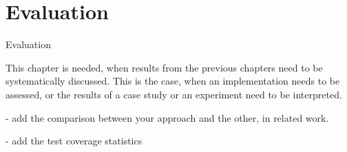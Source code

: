 \chapter{Evaluation}
\label{Evaluation}

Evaluation

This chapter is needed, when results from the previous chapters need to be systematically discussed. This is the case, when an implementation needs to be assessed, or the results of a case study or an experiment need to be interpreted.


- add the comparison between your approach and the other, in related work.

- add the test coverage statistics
